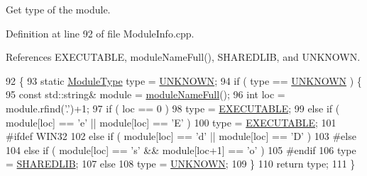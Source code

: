 Get type of the module. 



Definition at line 92 of file Module\+Info.\+cpp.



References E\+X\+E\+C\+U\+T\+A\+B\+LE, module\+Name\+Full(), S\+H\+A\+R\+E\+D\+L\+IB, and U\+N\+K\+N\+O\+WN.


\begin{DoxyCode}
92                                             \{
93   \textcolor{keyword}{static} \hyperlink{namespaceSystem_a12d36cf455e22c1e75ef65a2105df4c5}{ModuleType} type = \hyperlink{namespaceSystem_a12d36cf455e22c1e75ef65a2105df4c5a674d015a465c28de6e2f385f071c25a2}{UNKNOWN};
94   \textcolor{keywordflow}{if} ( type == \hyperlink{namespaceSystem_a12d36cf455e22c1e75ef65a2105df4c5a674d015a465c28de6e2f385f071c25a2}{UNKNOWN} )    \{
95     \textcolor{keyword}{const} std::string& module = \hyperlink{namespaceSystem_abbb9e2ab2f883bfe24805d89bef43792}{moduleNameFull}();
96     \textcolor{keywordtype}{int} loc = module.rfind(\textcolor{charliteral}{'.'})+1;
97     \textcolor{keywordflow}{if} ( loc == 0 )
98       type = \hyperlink{namespaceSystem_a12d36cf455e22c1e75ef65a2105df4c5a130859e092dc88d9e2eed92640885830}{EXECUTABLE};
99     \textcolor{keywordflow}{else} \textcolor{keywordflow}{if} ( module[loc] == \textcolor{charliteral}{'e'} || module[loc] == \textcolor{charliteral}{'E'} )
100       type = \hyperlink{namespaceSystem_a12d36cf455e22c1e75ef65a2105df4c5a130859e092dc88d9e2eed92640885830}{EXECUTABLE};
101 \textcolor{preprocessor}{#ifdef WIN32}
102     \textcolor{keywordflow}{else} \textcolor{keywordflow}{if} ( module[loc] == \textcolor{charliteral}{'d'} || module[loc] == \textcolor{charliteral}{'D'} )
103 \textcolor{preprocessor}{#else}
104     \textcolor{keywordflow}{else} \textcolor{keywordflow}{if} ( module[loc] == \textcolor{charliteral}{'s'} && module[loc+1] == \textcolor{charliteral}{'o'} )
105 \textcolor{preprocessor}{#endif}
106       type = \hyperlink{namespaceSystem_a12d36cf455e22c1e75ef65a2105df4c5a2caa15b2f0df35f7d8b6c3d3f9f52d44}{SHAREDLIB};
107     \textcolor{keywordflow}{else}
108       type = \hyperlink{namespaceSystem_a12d36cf455e22c1e75ef65a2105df4c5a674d015a465c28de6e2f385f071c25a2}{UNKNOWN};
109   \}
110   \textcolor{keywordflow}{return} type;
111 \}
\end{DoxyCode}
\mbox{\label{namespaceSystem_a45f2f8ee27a6b62a7eb104306db16dc9}} 
